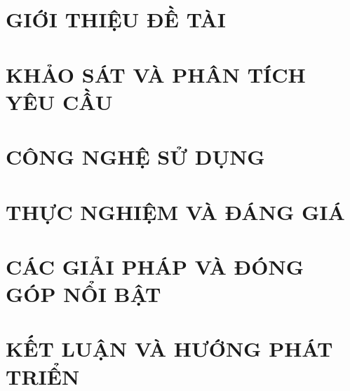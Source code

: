 \documentclass[a4paper,13pt,3p,twoside]{report}
\theoremstyle{definition}
\begin{document}
\glsaddall 
\renewcommand*{\acronymname}{DANH MỤC THUẬT NGỮ VÀ TỪ VIẾT TẮT}
\renewcommand*{\entryname}{Thuật ngữ}
\renewcommand*{\descriptionname}{Ý nghĩa}
\printnoidxglossaries

% 

% 


\newpage
{}

\pagestyle{fancy}
\fancyhf{}
\fancyhead[RE, LO]{\leftmark}
\fancyfoot[RE, LO]{\thepage}

\chapter{GIỚI THIỆU ĐỀ TÀI}
\label{chapter:Introduction}

\newpage
\chapter{KHẢO SÁT VÀ PHÂN TÍCH YÊU CẦU}
\label{chapter:Related_works}



\newpage
\chapter{CÔNG NGHỆ SỬ DỤNG}
\label{chapter:Methodology}


\newpage
\chapter{THỰC NGHIỆM VÀ ĐÁNG GIÁ}
\label{chapter:Experiment}


\newpage
\chapter{CÁC GIẢI PHÁP VÀ ĐÓNG GÓP NỔI BẬT}
\label{chapter:SolutionAndContribution}

\newpage
\chapter{KẾT LUẬN VÀ HƯỚNG PHÁT TRIỂN} %
\label{chapter:conclusion}

\end{document}

